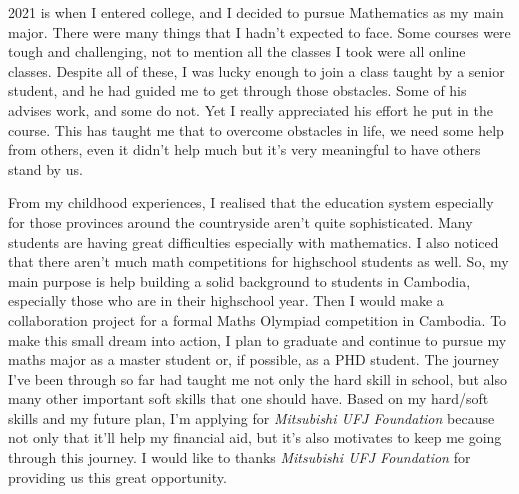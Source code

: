 \documentclass{article}
\begin{document}
2021 is when I entered college, and I decided to pursue Mathematics 
as my main major. There were many things that I hadn't expected to face.
Some courses were tough and challenging, not to mention all the classes
I took were all online classes. Despite all of these, I was lucky enough 
to join a class taught by a senior student, and he had guided me to
get through those obstacles. Some of his advises work, and some do not.
Yet I really appreciated his effort he put in the course. 
This has  taught me that to overcome obstacles in life, we need some help
from others, even it didn't help much but it's very meaningful to have
others stand by us. %

From my childhood experiences, I realised that the education system
especially for those provinces around the countryside aren't quite
sophisticated. Many students are having great difficulties especially
with mathematics. I also noticed that there aren't much math competitions
for highschool students as well. So, my main purpose is help building 
a solid background to students in Cambodia, especially those who are in 
their highschool year. Then I would make a collaboration
project for a formal Maths Olympiad competition in Cambodia.
To make this small dream into action, I plan to graduate and
continue to pursue my maths major as a master student or, if possible,
as a PHD student.
The journey I've been through so far had taught me not only the hard
skill in school, but also many other important soft skills that one 
should have. 
Based on my hard/soft skills and my future plan, I'm applying
for \textit{Mitsubishi UFJ Foundation}
because not only that it'll help my financial aid, but it's also 
motivates to keep me going through this journey.
I would like to thanks \textit{Mitsubishi UFJ Foundation} for
providing us this great opportunity.
\end{document}
